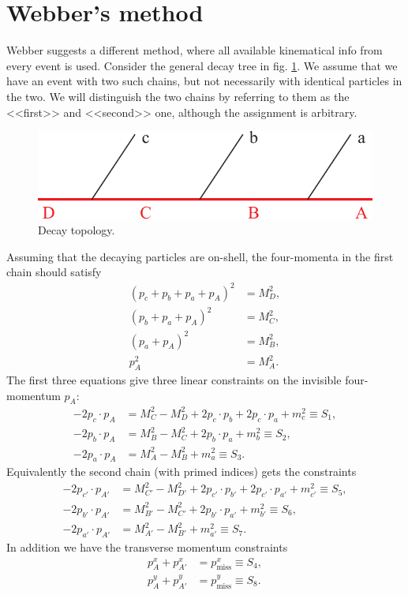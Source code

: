 \documentclass[twoside,english]{uiofysmaster}
\begin{document}
\section{Webber's method}
Webber \cite{Webber:2009vm} suggests a different method, where all available kinematical info from every event is used. Consider the general decay tree in fig. \ref{fig:decaytree}. We assume that we have an event with two such chains, but not necessarily with identical particles in the two. We will distinguish the two chains by referring to them as the <<first>> and <<second>> one, although the assignment is arbitrary.
\begin{figure}[hbt]
\centering
\includegraphics[scale=0.7]{figures/fig-chain.pdf} %
\caption{Decay topology.}
\label{fig:decaytree}
\end{figure}
Assuming that the decaying particles are on-shell, the four-momenta in the first chain should satisfy
\begin{align}
	(p_c + p_b + p_a + p_A)^2 &= M_D^2,\nonumber \\
	(p_b + p_a + p_A)^2 &= M_C^2,\nonumber \\
	(p_a + p_A)^2 &= M_B^2,\label{eq:constraints}\\
	p_A^2 &= M_A^2.\nonumber
\end{align}
The first three equations give three linear constraints on the invisible four-momentum $p_A$:
\begin{align}
	-2p_c\cdot p_A &= M_C^2 - M_D^2 + 2p_c\cdot p_b + 2p_c \cdot p_a + m_c^2 \equiv S_1,\nonumber \\
	-2p_b\cdot p_A &= M_B^2 - M_C^2 + 2p_b\cdot p_a + m_b^2 \equiv S_2,\\
	-2p_a\cdot p_A &= M_A^2 - M_B^2 + m_a^2 \equiv S_3. \nonumber
\end{align}
Equivalently the second chain (with primed indices) gets the constraints
\begin{align}
	-2p_{c'}\cdot p_{A'} &= M_{C'}^2 - M_{D'}^2 + 2p_{c'}\cdot p_{b'} + 2p_{c'} \cdot p_{a'} + m_{c'}^2 \equiv S_5,\nonumber \\ 
	-2p_{b'}\cdot p_{A'} &= M_{B'}^2 - M_{C'}^2 + 2p_{b'}\cdot p_{a'} + m_{b'}^2 \equiv S_6,\\
	-2p_{a'}\cdot p_{A'} &= M_{A'}^2 - M_{B'}^2 + m_{a'}^2 \equiv S_7.\nonumber
\end{align}
In addition we have the transverse momentum constraints
\begin{align}
	p_A^x + p_{A'}^x &= p_\mathrm{miss}^x \equiv S_4, \label{eq:Svec_orig} \\
	p_A^y + p_{A'}^y &= p_\mathrm{miss}^y \equiv S_8. \nonumber
\end{align}
\end{document}
